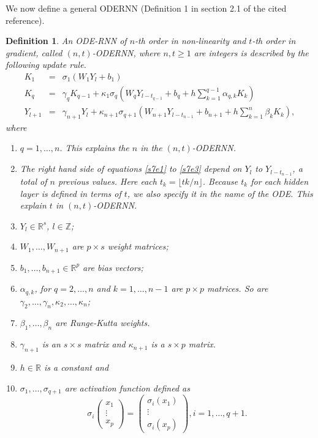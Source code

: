 \documentclass{article}
\numberwithin{equation}{section}
\newtheorem{defn}{Definition}
\begin{document}
We now define a general ODERNN\cite{niu2019recurrent} (Definition 1 in section
2.1 of the cited reference).
\begin{defn}\label{s7d1}
An ODE-RNN of $n$-th order in non-linearity and $t$-th order in gradient,
called $(n,t)$-ODERNN, where $n, t \ge 1$ are integers is described by
the following update rule.
\begin{eqnarray}
K_1 &=& \sigma_1(W_1Y_l + b_1) \label{s7e1} \\
K_q &=& \gamma_q K_{q-1} + \kappa_1\sigma_q\left(
 W_qY_{l-t_{q-1}}+b_q+h\sum_{k=1}^{q-1}\alpha_{q,k}K_k\right)\label{s7e2}\\
Y_{l+1} &=& \gamma_{n+1}Y_l + \kappa_{n+1}\sigma_{q+1}\left(
 W_{n+1}Y_{l-t_{n-1}}+b_{n+1}+h\sum_{k=1}^n\beta_kK_k
 \right)\label{s7e3},
\end{eqnarray}
where
\begin{enumerate}
\item $q = 1, \ldots, n$. This explains the $n$ in the $(n,t)$-ODERNN.
\item The right hand side of equations \eqref{s7e1} to \eqref{s7e3} 
depend on $Y_l$ to $Y_{l - t_{n-1}}$, a total of $n$ previous values.
Here each $t_k = \lfloor tk/n\rfloor$. Because $t_k$ for each hidden layer
is defined in terms of $t$, we also specify it in the name of the ODE. 
This explain $t$ in $(n, t)$-ODERNN.
\item $Y_l \in \mathbb{R}^s$, $l \in \mathbb{Z}$;
\item $W_1,\ldots, W_{n+1}$ are $p \times s$ weight matrices; 
\item $b_1,\ldots, b_{n+1} \in \mathbb{R}^p$ are bias vectors; 
\item $\alpha_{q, k}$, for $q = 2, \ldots, n$ and $k = 1, \ldots, n - 1$
are $p \times p$ matrices. So are $\gamma_2, \ldots, \gamma_{n}, \kappa_2, 
\ldots, \kappa_{n}$;
\item $\beta_1, \ldots, \beta_n$ are Runge-Kutta weights. 
\item $\gamma_{n+1}$ is an $s \times s$ matrix and $\kappa_{n+1}$ is a 
$s \times p$ matrix.
\item $h \in \mathbb{R}$ is a constant and
\item $\sigma_1, \ldots, \sigma_{q+1}$ are activation function defined as
\[
\sigma_i\begin{pmatrix}x_1 \\ \vdots \\ x_p\end{pmatrix} = 
\begin{pmatrix}\sigma_i(x_1) \\ \vdots \\ \sigma_i(x_p)\end{pmatrix},
i = 1, \ldots, q+1.
\]
\end{enumerate}
\end{defn}
\end{document}
